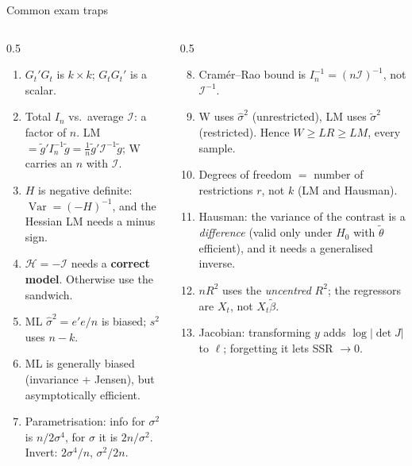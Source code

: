 \documentclass[aspectratio=169,11pt,t]{beamer}
\DeclareMathOperator{\Var}{Var}
\newcommand{\cI}{\mathcal{I}}          %
\newcommand{\In}{I_{n}}                %
\newcommand{\cH}{\mathcal{H}}          %
\newcommand{\tth}{\tilde\theta}
\begin{document}
\begin{frame}{Common exam traps}
\footnotesize
\begin{columns}[T,onlytextwidth]
\begin{column}{0.5\textwidth}
\begin{enumerate}
 \item $G_{t}'G_{t}$ is $k\times k$; $G_{t}G_{t}'$ is a scalar.
 \item Total $\In$ vs.\ average $\cI$: a factor of $n$. LM $=\tilde g'\In^{-1}\tilde g=\frac1n\tilde g'\cI^{-1}\tilde g$; W carries an $n$ with $\cI$.
 \item $H$ is negative definite: $\Var=(-H)^{-1}$, and the Hessian LM needs a minus sign.
 \item $\cH=-\cI$ needs a \textbf{correct model}. Otherwise use the sandwich.
 \item ML $\hat\sigma^{2}=e'e/n$ is biased; $s^{2}$ uses $n-k$.
 \item ML is generally biased (invariance + Jensen), but asymptotically efficient.
 \item Parametrisation: info for $\sigma^{2}$ is $n/2\sigma^{4}$, for $\sigma$ it is $2n/\sigma^{2}$. Invert: $2\sigma^{4}/n$, $\sigma^{2}/2n$.
\end{enumerate}
\end{column}
\begin{column}{0.5\textwidth}
\begin{enumerate}\setcounter{enumi}{7}
 \item Cram\'er--Rao bound is $\In^{-1}=(n\cI)^{-1}$, not $\cI^{-1}$.
 \item W uses $\hat\sigma^{2}$ (unrestricted), LM uses $\tilde\sigma^{2}$ (restricted). Hence $W\ge LR\ge LM$, every sample.
 \item Degrees of freedom $=$ number of restrictions $r$, not $k$ (LM and Hausman).
 \item Hausman: the variance of the contrast is a \emph{difference} (valid only under $H_{0}$ with $\tth$ efficient), and it needs a generalised inverse.
 \item $nR^{2}$ uses the \emph{uncentred} $R^{2}$; the regressors are $X_{t}$, not $X_{t}\tilde\beta$.
 \item Jacobian: transforming $y$ adds $\log|\det J|$ to $\ell$; forgetting it lets SSR $\to0$.
\end{enumerate}
\end{column}
\end{columns}
\end{frame}
\end{document}
